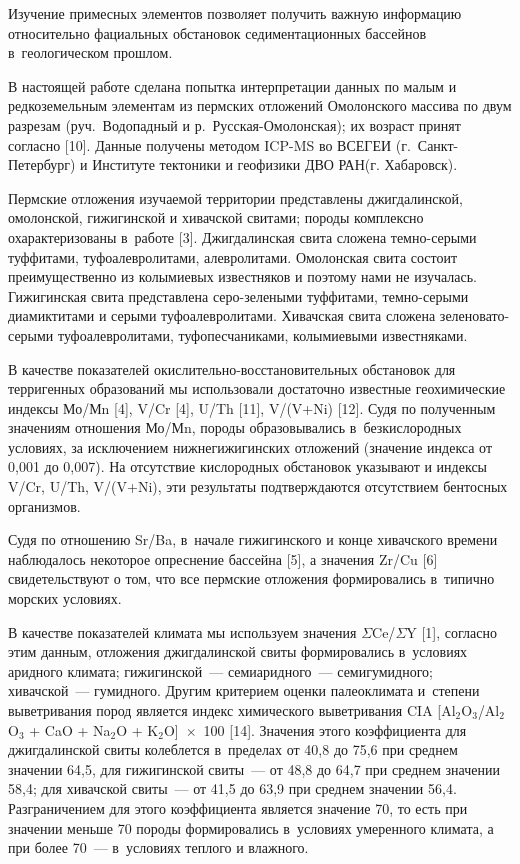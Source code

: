  

\makeProcTitleRazdel
{}

Изучение примесных элементов позволяет получить важную информацию относительно фациальных обстановок седиментационных бассейнов в~геологическом прошлом.

В настоящей работе сделана попытка интерпретации данных по малым и редкоземельным элементам из пермских отложений Омолонского массива по двум разрезам (руч.~Водопадный и р.~Русская-Омолонская); их возраст принят согласно [10]. Данные получены методом ICP-MS во ВСЕГЕИ (г.~Санкт-Петербург) и Институте тектоники и геофизики ДВО РАН(г. Хабаровск).

Пермские отложения изучаемой территории представлены джигдалинской, омолонской, гижигинской и хивачской свитами; породы комплексно охарактеризованы в~работе [3]. Джигдалинская свита сложена темно-серыми туффитами, туфоалевролитами, алевролитами. Омолонская свита состоит преимущественно из колымиевых известняков и поэтому нами не изучалась. Гижигинская свита представлена серо-зелеными туффитами, темно-серыми диамиктитами и серыми туфоалевролитами. Хивачская свита сложена зеленовато-серыми туфоалевролитами, туфопесчаниками, колымиевыми известняками.

В качестве показателей окислительно-восстановительных обстановок для терригенных образований мы использовали достаточно известные геохимические индексы Мо/Мn [4], V/Cr [4], U/Th [11], V/(V+Ni) [12]. Судя по полученным значениям отношения Мо/Мn, породы образовывались в~безкислородных условиях, за исключением нижнегижигинских отложений (значение индекса от 0,001 до 0,007). На отсутствие кислородных обстановок указывают и индексы V/Cr, U/Th, V/(V+Ni), эти результаты подтверждаются отсутствием
бентосных организмов.

Судя по отношению Sr/Ba, в~начале гижигинского и конце хивачского времени наблюдалось некоторое опреснение бассейна [5], а значения Zr/Cu [6] свидетельствуют о том, что все пермские отложения формировались в~типично морских условиях.

В качестве показателей климата мы используем значения $\Sigma$Ce/$\Sigma$Y [1], согласно этим данным, отложения джигдалинской свиты формировались в~условиях аридного климата; гижигинской~--- семиаридного~--- семигумидного; хивачской~--- гумидного. Другим критерием оценки палеоклимата и~степени выветривания пород является индекс химического выветривания CIA [Al$_{2}$O$_{3}$/Al$_{2}$O$_{3}$ + CaO + Na$_{2}$O + K$_{2}$O]~$\times$~100 [14]. Значения этого коэффициента для джигдалинской свиты колеблется в~пределах от 40,8 до 75,6 при среднем значении 64,5, для гижигинской свиты~--- от 48,8 до 64,7 при среднем значении 58,4; для хивачской свиты~--- от 41,5 до 63,9 при среднем значении 56,4. Разграничением для этого коэффициента является значение 70, то есть при значении меньше 70 породы формировались в~условиях умеренного климата, а при более 70~--- в~условиях теплого и влажного.

